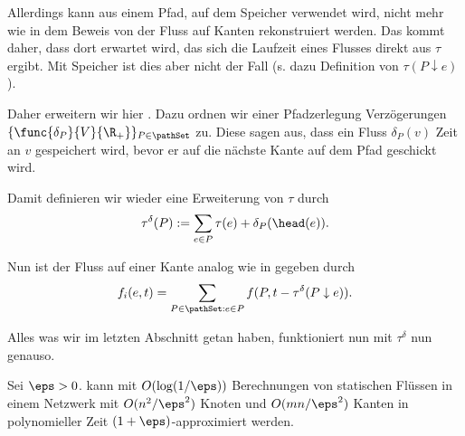Allerdings kann aus einem Pfad, auf dem Speicher verwendet wird, nicht mehr wie
in dem Beweis von  der Fluss auf Kanten rekonstruiert werden.
Das kommt daher, dass dort erwartet wird, das sich die Laufzeit eines Flusses
direkt aus $\tau$ ergibt. Mit Speicher ist dies aber nicht der Fall
(s. dazu Definition von $\tau(P \downarrow e)$).

Daher erweitern wir hier . Dazu ordnen wir einer Pfadzerlegung
Verzögerungen $\{\func{\delta_P}{V}{\R_+}\}_{P \in \pathSet}$ zu. Diese sagen aus,
dass ein Fluss $\delta_P(v)$ Zeit an $v$ gespeichert wird, bevor er auf die nächste
Kante auf dem Pfad geschickt wird.

Damit definieren wir wieder eine Erweiterung von $\tau$ durch
\[
    \tau^{\delta}(P) := \sum_{e \in P} \tau(e) + \delta_P(\head(e)).
\]

Nun ist der Fluss auf einer Kante analog wie in  gegeben durch
\[
    f_i(e, t) = \sum_{P \in \pathSet : e \in P}
                    f(P, t - \tau^{\delta}(P \downarrow e)) .
\]

Alles was wir im letzten Abschnitt getan haben, funktioniert nun mit $\tau^{\delta}$
nun genauso.



\begin{theorem}
    Sei $\eps > 0$.  kann mit $O(\log(1/\eps))$
    Berechnungen von statischen Flüssen in einem Netzwerk mit
    $O(n^2/\eps^2)$ Knoten und $O(mn/\eps^2)$ Kanten
    in polynomieller Zeit $(1+\eps)$-approximiert werden.
\end{theorem}


